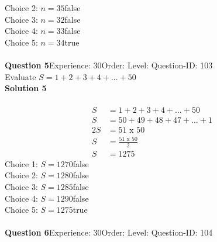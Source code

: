 \documentclass{article}
\begin{document}
Choice 2: \hspace{20pt}$n=35$\hspace{20pt}false\\
Choice 3: \hspace{20pt}$n=32$\hspace{20pt}false\\
Choice 4: \hspace{20pt}$n=33$\hspace{20pt}false\\
Choice 5: \hspace{20pt}$n=34$\hspace{20pt}true\\
\\[4pt]
\noindent\textbf{Question 5}\hspace{20pt}Experience: 30\hspace{20pt}Order: \hspace{20pt}Level: \hspace{20pt}Question-ID: 103\\[2pt]
Evaluate $S=1+2+3+4+...+50$\\[4pt]
\noindent\textbf{Solution 5}\\[2pt]
\\[-35pt]\begin{align*}
S&=1+2+3+4+...+50\\[2pt]
S&=50+49+48+47+...+1\\[2pt]
2S&=51\,\,\text{x}\,\,50\\[2pt]
S&=\displaystyle\frac{51\,\,\text{x}\,\,50}{2}\\[2pt]
S&=1275
\end{align*}
Choice 1: \hspace{20pt}$S=1270$\hspace{20pt}false\\
Choice 2: \hspace{20pt}$S=1280$\hspace{20pt}false\\
Choice 3: \hspace{20pt}$S=1285$\hspace{20pt}false\\
Choice 4: \hspace{20pt}$S=1290$\hspace{20pt}false\\
Choice 5: \hspace{20pt}$S=1275$\hspace{20pt}true\\
\\[4pt]
\noindent\textbf{Question 6}\hspace{20pt}Experience: 30\hspace{20pt}Order: \hspace{20pt}Level: \hspace{20pt}Question-ID: 104\\[2pt]
\end{document}
